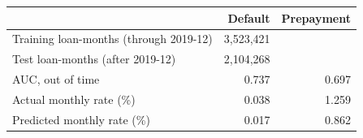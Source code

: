 \begin{tabular}{lrr}
\toprule
& Default & Prepayment \\
\midrule
Training loan-months (through 2019-12) & 3,523,421 &  \\
Test loan-months (after 2019-12) & 2,104,268 &  \\
AUC, out of time & 0.737 & 0.697 \\
Actual monthly rate (\%) & 0.038 & 1.259 \\
Predicted monthly rate (\%) & 0.017 & 0.862 \\
\bottomrule
\end{tabular}
